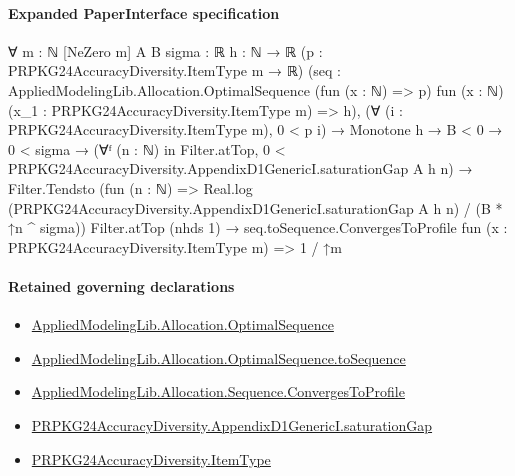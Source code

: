 \documentclass[10pt]{article}
\begin{document}
\paragraph{Expanded PaperInterface specification}
\begin{ReviewVerbatim}
∀ {m : ℕ} [NeZero m] {A B sigma : ℝ} {h : ℕ → ℝ} (p : PRPKG24AccuracyDiversity.ItemType m → ℝ)
  (seq :
    AppliedModelingLib.Allocation.OptimalSequence (fun (x : ℕ) => p)
      fun (x : ℕ) (x_1 : PRPKG24AccuracyDiversity.ItemType m) => h),
  (∀ (i : PRPKG24AccuracyDiversity.ItemType m), 0 < p i) →
    Monotone h →
      B < 0 →
        0 < sigma →
          (∀ᶠ (n : ℕ) in Filter.atTop, 0 < PRPKG24AccuracyDiversity.AppendixD1GenericI.saturationGap A h n) →
            Filter.Tendsto
                (fun (n : ℕ) =>
                  Real.log (PRPKG24AccuracyDiversity.AppendixD1GenericI.saturationGap A h n) / (B * ↑n ^ sigma))
                Filter.atTop (nhds 1) →
              seq.toSequence.ConvergesToProfile fun (x : PRPKG24AccuracyDiversity.ItemType m) => 1 / ↑m
\end{ReviewVerbatim}

\paragraph{Retained governing declarations}
\begin{itemize}\raggedright
\item \hyperlink{governing-declaration-de3def91e8620291}{Applied\allowbreak{}Modeling\allowbreak{}Lib.\allowbreak{}Allocation.\allowbreak{}Optimal\allowbreak{}Sequence}
\item \hyperlink{governing-declaration-7a4a864147660f7c}{Applied\allowbreak{}Modeling\allowbreak{}Lib.\allowbreak{}Allocation.\allowbreak{}Optimal\allowbreak{}Sequence.\allowbreak{}to\allowbreak{}Sequence}
\item \hyperlink{governing-declaration-ec09422b2ba8f633}{Applied\allowbreak{}Modeling\allowbreak{}Lib.\allowbreak{}Allocation.\allowbreak{}Sequence.\allowbreak{}Converges\allowbreak{}To\allowbreak{}Profile}
\item \hyperlink{governing-declaration-abe45c15cdd9003d}{PRPKG24\allowbreak{}Accuracy\allowbreak{}Diversity.\allowbreak{}Appendix\allowbreak{}D1\allowbreak{}Generic\allowbreak{}I.\allowbreak{}saturation\allowbreak{}Gap}
\item \hyperlink{governing-declaration-562ef32e180a12be}{PRPKG24\allowbreak{}Accuracy\allowbreak{}Diversity.\allowbreak{}Item\allowbreak{}Type}
\end{itemize}
\end{document}
